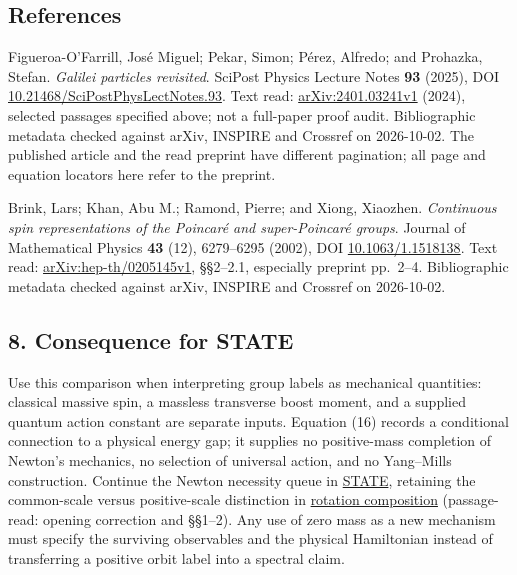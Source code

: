 \documentclass[11pt,a4paper]{article}
\begin{document}
\hypertarget{references}{%
\subsection{References}\label{references}}

Figueroa-O'Farrill, José Miguel; Pekar, Simon; Pérez, Alfredo; and
Prohazka, Stefan. \emph{Galilei particles revisited}. SciPost Physics
Lecture Notes \textbf{93} (2025), DOI
\href{https://doi.org/10.21468/SciPostPhysLectNotes.93}{10.21468/SciPostPhysLectNotes.93}.
Text read: \href{https://arxiv.org/pdf/2401.03241v1}{arXiv:2401.03241v1}
(2024), selected passages specified above; not a full-paper proof audit.
Bibliographic metadata checked against arXiv, INSPIRE and Crossref on
2026-10-02. The published article and the read preprint have different
pagination; all page and equation locators here refer to the preprint.

Brink, Lars; Khan, Abu M.; Ramond, Pierre; and Xiong, Xiaozhen.
\emph{Continuous spin representations of the Poincaré and super-Poincaré
groups}. Journal of Mathematical Physics \textbf{43} (12), 6279--6295
(2002), DOI \href{https://doi.org/10.1063/1.1518138}{10.1063/1.1518138}.
Text read:
\href{https://arxiv.org/pdf/hep-th/0205145v1}{arXiv:hep-th/0205145v1},
§§2--2.1, especially preprint pp.~2--4. Bibliographic metadata checked
against arXiv, INSPIRE and Crossref on 2026-10-02.

\hypertarget{consequence-for-state}{%
\subsection{8. Consequence for STATE}\label{consequence-for-state}}

Use this comparison when interpreting group labels as mechanical
quantities: classical massive spin, a massless transverse boost moment,
and a supplied quantum action constant are separate inputs. Equation
(16) records a conditional connection to a physical energy gap; it
supplies no positive-mass completion of Newton's mechanics, no selection
of universal action, and no Yang--Mills construction. Continue the
Newton necessity queue in \href{../research/STATE.md}{STATE}, retaining
the common-scale versus positive-scale distinction in
\href{rotation-composition-universality.md}{rotation composition}
(passage-read: opening correction and §§1--2). Any use of zero mass as a
new mechanism must specify the surviving observables and the physical
Hamiltonian instead of transferring a positive orbit label into a
spectral claim.
\end{document}
